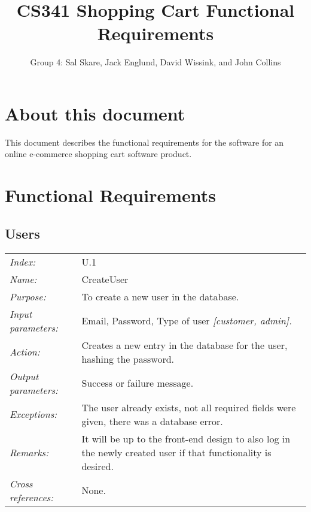 \documentclass[10pt,letter]{article}
\begin{document}

\title{CS341 Shopping Cart Functional Requirements}

\author{Group 4: Sal Skare, Jack Englund, David Wissink, and John Collins}

\maketitle 

\section{About this document} This document describes the functional requirements for the 
software for an online e-commerce shopping cart software product.

\section{Functional Requirements}

\subsection{Users}

\begin{tabularx}{\textwidth}{l X}
    \it{Index:} & U.1 \\
    \it{Name:} & CreateUser \\
    \it{Purpose:} & To create a new user in the database. \\
    \it{Input parameters:} & Email, Password, Type of user \it{[customer, admin]}. \\
    \it{Action:} & Creates a new entry in the database for the user, hashing the password. \\
    \it{Output parameters:} & Success or failure message. \\
    \it{Exceptions:} & The user already exists, not all required fields were given, there 
    was a database error. \\
    \it{Remarks:} & It will be up to the front-end design to also log in the newly created 
    user if that functionality is desired. \\
    \it{Cross references:} & None. \\
    \hline
\end{tabularx}
\end{document}
